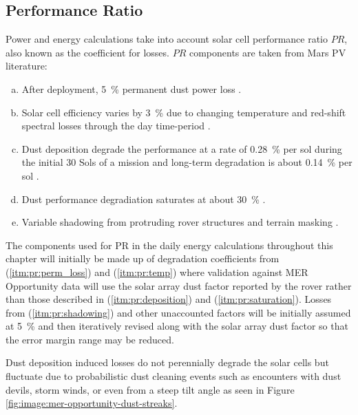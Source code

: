 \subsection{Performance Ratio}
\label{sec:PowerAndEnergyPredictions:PerformanceRatio}
Power and energy calculations take into account solar cell performance ratio $PR$, also known as the coefficient for losses. $PR$ components are taken from Mars \ac{PV} literature:

\begin{enumerate}[(a)]
  \item\label{itm:pr:perm_loss}After deployment, \SI{5}{\percent} permanent dust power loss .
  \item\label{itm:pr:temp}Solar cell efficiency varies by \SI{3}{\percent} due to changing temperature and red-shift spectral losses through the day time-period .
  \item\label{itm:pr:deposition}Dust deposition degrade the performance at a rate of \SI{0.28}{\percent} per sol during the initial 30 Sols of a mission and long-term degradation is about \SI{0.14}{\percent} per sol .
  \item\label{itm:pr:saturation}Dust performance degradiation saturates at about \SI{30}{\percent} .
  \item\label{itm:pr:shadowing}Variable shadowing from protruding rover structures  and terrain masking .
\end{enumerate}

The components used for \ac{PR} in the daily energy calculations throughout this chapter will initially be made up of degradation coefficients from (\ref{itm:pr:perm_loss}) and (\ref{itm:pr:temp}) where validation against \ac{MER} Opportunity data will use the solar array dust factor reported by the rover rather than those described in (\ref{itm:pr:deposition}) and (\ref{itm:pr:saturation}). Losses from (\ref{itm:pr:shadowing}) and other unaccounted factors will be initially assumed at \SI{5}{\percent} and then iteratively revised along with the solar array dust factor so that the error margin range may be reduced.

Dust deposition induced losses do not perennially degrade the solar cells but fluctuate due to probabilistic dust cleaning events such as encounters with dust devils, storm winds, or even from a steep tilt angle as seen in Figure \ref{fig:image:mer-opportunity-dust-streaks}.

